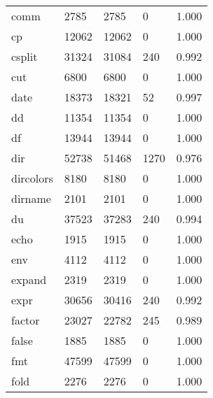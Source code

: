 \begin{longtable}{lp{3.0cm}p{3.0cm}p{3.0cm}p{3.0cm}}
comm      &                     2785 &         2785 &             0 &                    1.000 \\
cp        &                    12062 &        12062 &             0 &                    1.000 \\
csplit    &                    31324 &        31084 &           240 &                    0.992 \\
cut       &                     6800 &         6800 &             0 &                    1.000 \\
date      &                    18373 &        18321 &            52 &                    0.997 \\
dd        &                    11354 &        11354 &             0 &                    1.000 \\
df        &                    13944 &        13944 &             0 &                    1.000 \\
dir       &                    52738 &        51468 &          1270 &                    0.976 \\
dircolors &                     8180 &         8180 &             0 &                    1.000 \\
dirname   &                     2101 &         2101 &             0 &                    1.000 \\
du        &                    37523 &        37283 &           240 &                    0.994 \\
echo      &                     1915 &         1915 &             0 &                    1.000 \\
env       &                     4112 &         4112 &             0 &                    1.000 \\
expand    &                     2319 &         2319 &             0 &                    1.000 \\
expr      &                    30656 &        30416 &           240 &                    0.992 \\
factor    &                    23027 &        22782 &           245 &                    0.989 \\
false     &                     1885 &         1885 &             0 &                    1.000 \\
fmt       &                    47599 &        47599 &             0 &                    1.000 \\
fold      &                     2276 &         2276 &             0 &                    1.000 \\

\end{longtable}
